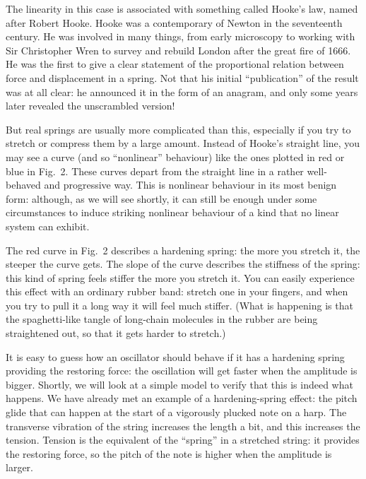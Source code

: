 
  The linearity in this case is associated with something called Hooke’s law, 
  named after Robert Hooke. Hooke was a contemporary of Newton in the 
  seventeenth century. He was involved in many things, from early microscopy to 
  working with Sir Christopher Wren to survey and rebuild London after the 
  great fire of 1666. He was the first to give a clear statement of the 
  proportional relation between force and displacement in a spring. Not that 
  his initial ``publication'' of the result was at all clear: he announced it 
  in the form of an anagram, and only some years later revealed the unscrambled 
  version! 

  But real springs are usually more complicated than this, especially if you 
  try to stretch or compress them by a large amount. Instead of Hooke’s 
  straight line, you may see a curve (and so “nonlinear” behaviour) like the 
  ones plotted in red or blue in Fig.\ 2. These curves depart from the straight 
  line in a rather well-behaved and progressive way. This is nonlinear 
  behaviour in its most benign form: although, as we will see shortly, it can 
  still be enough under some circumstances to induce striking nonlinear 
  behaviour of a kind that no linear system can exhibit. 


  The red curve in Fig.\ 2 describes a hardening spring: the more you stretch 
  it, the steeper the curve gets. The slope of the curve describes the 
  stiffness of the spring: this kind of spring feels stiffer the more you 
  stretch it. You can easily experience this effect with an ordinary rubber 
  band: stretch one in your fingers, and when you try to pull it a long way it 
  will feel much stiffer. (What is happening is that the spaghetti-like tangle 
  of long-chain molecules in the rubber are being straightened out, so that it 
  gets harder to stretch.) 

  It is easy to guess how an oscillator should behave if it has a hardening 
  spring providing the restoring force: the oscillation will get faster when 
  the amplitude is bigger. Shortly, we will look at a simple model to verify 
  that this is indeed what happens. We have already met an example of a 
  hardening-spring effect: the pitch glide that can happen at the start of a 
  vigorously plucked note on a harp. The transverse vibration of the string 
  increases the length a bit, and this increases the tension. Tension is the 
  equivalent of the ``spring'' in a stretched string: it provides the restoring 
  force, so the pitch of the note is higher when the amplitude is larger. 

